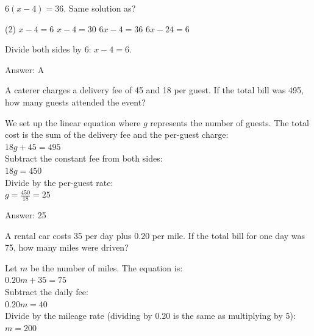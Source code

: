 \documentclass[11pt,paper=a4,answers]{exam}
\begin{document}
\begin{questions}
\question
$6(x - 4) = 36$. Same solution as?
\begin{tasks}(2)
    \task $x - 4 = 6$
    \task $x - 4 = 30$
    \task $6x - 4 = 36$
    \task $6x - 24 = 6$
\end{tasks}

\begin{solution}
Divide both sides by 6: $x - 4 = 6$.

\vspace{20pt}
Answer: \colorbox{yellow!100}{A}
\end{solution}


\question
A caterer charges a delivery fee of 45 and 18 per guest. If the total bill was 495, how many guests attended the event?

\begin{solution}
We set up the linear equation where $g$ represents the number of guests. The total cost is the sum of the delivery fee and the per-guest charge:
\\[10pt]
$18g + 45 = 495$ 
\\[10pt]
Subtract the constant fee from both sides:
\\[10pt]
$18g = 450$ 
\\[10pt]
Divide by the per-guest rate:
\\[10pt]
$g = \frac{450}{18} = 25$

\vspace{20pt}
Answer: \colorbox{yellow!100}{25}
\end{solution}

\question
A rental car costs 35 per day plus 0.20 per mile. If the total bill for one day was 75, how many miles were driven?

\begin{solution}
Let $m$ be the number of miles. The equation is:
\\[10pt]
$0.20m + 35 = 75$ 
\\[10pt]
Subtract the daily fee:
\\[10pt]
$0.20m = 40$ 
\\[10pt]
Divide by the mileage rate (dividing by 0.20 is the same as multiplying by 5):
\\[10pt]
$m = 200$


\end{solution}
\end{questions}
\end{document}
